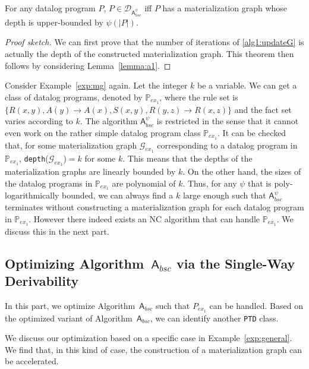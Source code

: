 \documentclass[final,1p,times]{elsarticle}
\begin{document}
\begin{theorem}\label{theorem:a1}
For any datalog program $P$, $P\in\mathcal{D}_{\mathsf{A}_{bsc}^{\psi}}$ iff $P$ has a
materialization graph whose depth is upper-bounded by $\psi(|P|)$.
\end{theorem}

\begin{proof}[Proof sketch]
We can first prove that the number of iterations
of \ref{alg1:updateG} is actually the depth of the constructed materialization
graph. This theorem then follows by considering
Lemma~\ref{lemma:a1}.
\end{proof}

Consider Example~\ref{exp:mg} again. Let the integer $k$ be a variable. We can
get a class of datalog programs, denoted by $\mathbb{P}_{ex_1}$, where the rule set
is $\{R(x,y),A(y)\rightarrow A(x), S(x,y),R(y,z)\rightarrow R(x,z)\}$ and the fact
set varies according to $k$. The algorithm $\mathsf{A}_{bsc}^{\psi}$ is restricted in the sense that it cannot even work on the rather simple datalog program class $\mathbb{P}_{ex_1}$.
It can be checked that, for some materialization graph $\mathcal{G}_{ex_1}$
corresponding to a datalog program in $\mathbb{P}_{ex_1}$, \texttt{depth}($\mathcal{G}_{ex_1}$)$=k$ for some $k$.
This means that the depths of the materialization graphs are linearly bounded by $k$.
On the other hand, the sizes of the datalog programs in $\mathbb{P}_{ex_1}$ are polynomial of $k$.
Thus, for any $\psi$ that is poly-logarithmically bounded, we can always find a $k$ large
enough such that $\mathsf{A}_{bsc}^{\psi}$ terminates without constructing a materialization
graph for each datalog program in $\mathbb{P}_{ex_1}$.
However there indeed exists an NC algorithm that can handle $\mathbb{P}_{ex_1}$.
We discuss this in the next part.


\subsection{Optimizing Algorithm~$\mathsf{A}_{bsc}$ via the Single-Way Derivability}

In this part, we optimize Algorithm~$\mathsf{A}_{bsc}$ such that $P_{ex_1}$
can be handled. Based on the optimized variant of Algorithm~$\mathsf{A}_{bsc}$,
we can identify another \texttt{PTD} class.

We discuss our optimization based on a specific case in Example~\ref{exp:general}.
We find that, in this kind of case, the construction of a materialization graph can be accelerated.
\end{document}

